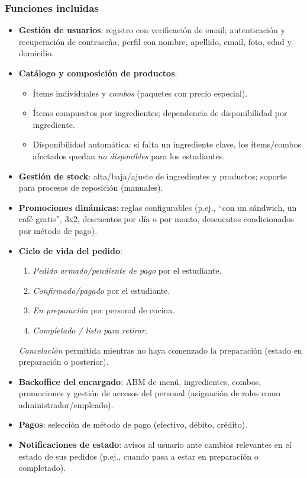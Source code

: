 \subsubsection*{Funciones incluidas}
\begin{itemize}
  \item \textbf{Gestión de usuarios}: registro con verificación de email; autenticación y recuperación de contraseña; perfil con nombre, apellido, email, foto, edad y domicilio.
  \item \textbf{Catálogo y composición de productos}:
    \begin{itemize}
      \item Ítems individuales y \emph{combos} (paquetes con precio especial).
      \item Ítems compuestos por ingredientes; dependencia de disponibilidad por ingrediente.
      \item Disponibilidad automática: si falta un ingrediente clave, los ítems/combos afectados quedan \emph{no disponibles} para los estudiantes.
    \end{itemize}
  \item \textbf{Gestión de stock}: alta/baja/ajuste de ingredientes y productos; soporte para procesos de reposición (manuales).
  \item \textbf{Promociones dinámicas}: reglas configurables (p.ej., ``con un sándwich, un café gratis'', 3x2, descuentos por día o por monto, descuentos condicionados por método de pago).
  \item \textbf{Ciclo de vida del pedido}:
    \begin{enumerate}
      \item \emph{Pedido armado/pendiente de pago} por el estudiante.
      \item \emph{Confirmado/pagado} por el estudiante.
      \item \emph{En preparación} por personal de cocina.
      \item \emph{Completado / listo para retirar}.
    \end{enumerate}
    \noindent \emph{Cancelación} permitida mientras no haya comenzado la preparación (estado en preparación o posterior).
  \item \textbf{Backoffice del encargado}: ABM de menú, ingredientes, combos, promociones y gestión de accesos del personal (asignación de roles como administrador/empleado).
  \item \textbf{Pagos}: selección de método de pago (efectivo, débito, crédito).
  \item \textbf{Notificaciones de estado}: avisos al usuario ante cambios relevantes en el estado de sus pedidos (p.ej., cuando pasa a estar en preparación o completado).
\end{itemize}

